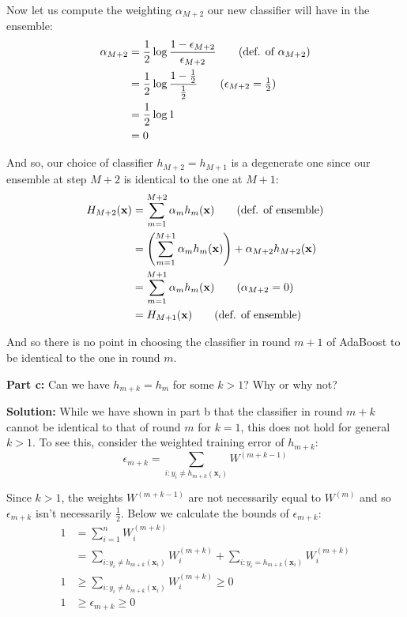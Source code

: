 \documentclass{article}
\renewcommand{\vec}[1]{\mathbf{#1}}
\begin{document}
Now let us compute the weighting $\alpha_{M+2}$ our new classifier will have in the ensemble:
\begin{align*}
  \alpha_{M+2}&=\frac{1}{2}\log\frac{1-\epsilon_{M+2}}{\epsilon_{M+2}}\tag{def. of $\alpha_{M+2}$}\\
  &=\frac{1}{2}\log\frac{1-\frac{1}{2}}{\frac{1}{2}}\tag{$\epsilon_{M+2}=\frac{1}{2}$}\\
  &=\frac{1}{2}\log1\\
  &=0
\end{align*}

And so, our choice of classifier $h_{M+2}=h_{M+1}$ is a degenerate one since our ensemble at step $M+2$ is identical to the one at $M+1$:
\begin{align*}
  H_{M+2}(\vec x)&=\sum^{M+2}_{m=1}\alpha_{m}h_{m}(\vec x)\tag{def. of ensemble}\\
  &=\left(\sum^{M+1}_{m=1}\alpha_{m}h_{m}(\vec x)\right)+\alpha_{M+2}h_{M+2}(\vec x)\\
  &=\sum^{M+1}_{m=1}\alpha_{m}h_{m}(\vec x)\tag{$\alpha_{M+2}=0$}\\
  &=H_{M+1}(\vec x)\tag{def. of ensemble}
\end{align*}

And so there is no point in choosing the classifier in round $m+1$ of AdaBoost to be identical to the one in round $m$.
\bigskip
\newpage

\noindent\textbf{Part c:} Can we have $h_{m+k}=h_{m}$ for some $k>1$? Why or why not?
\bigskip

\noindent\textbf{Solution:} While we have shown in part b that the classifier in round $m+k$ cannot be identical to that of round $m$ for $k=1$, this does not hold for general $k>1$. To see this, consider the weighted training error of $h_{m+k}$:
$$\epsilon_{m+k}=\sum_{i:y_i\not=h_{m+k}(\vec x_i)}W^{(m+k-1)}$$

Since $k>1$, the weights $W^{(m+k-1)}$ are not necessarily equal to $W^{(m)}$ and so $\epsilon_{m+k}$ isn't necessarily $\frac{1}{2}$. Below we calculate the bounds of $\epsilon_{m+k}$:
\begin{align*}
  1&=\sum_{i=1}^nW^{(m+k)}_i\tag{weights are normalized}\\
  &=\sum_{i:y_i\not=h_{m+k}(\vec x_i)}W^{(m+k)}_i+\sum_{i:y_i=h_{m+k}(\vec x_i)}W^{(m+k)}_i\tag{partition of sum}\\
  1&\ge\sum_{i:y_i\not=h_{m+k}(\vec x_i)}W^{(m+k)}_i\ge0\tag{weights are positive}\\
  1&\ge\epsilon_{m+k}\ge0\tag{def. of WTE}
\end{align*}
\end{document}
